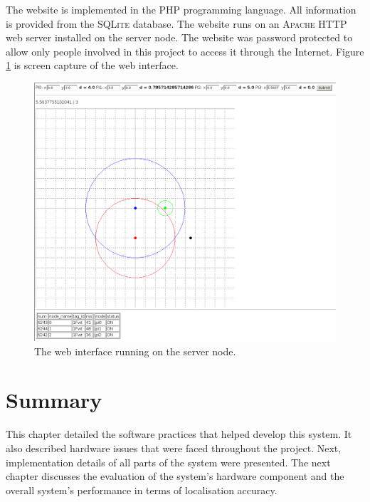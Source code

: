 The website is implemented in the \textsc{PHP} programming language. All information is provided from the \textsc{SQLite} database. The website runs on an \textsc{Apache} HTTP web server installed on the server node. The website was password protected to allow only people involved in this project to access it through the Internet. Figure \ref{fig:web} is screen capture of the web interface.

\begin{figure}[h]
	\begin{center}
		\includegraphics[width=.8\textwidth]{figures/sim}
		\caption{The web interface running on the server node.}
		\label{fig:web}
	\end{center}
\end{figure}


\section{Summary}

This chapter detailed the software practices that helped develop this system. It also described hardware issues that were faced throughout the project. Next, implementation details of all parts of the system were presented. The next chapter discusses the evaluation of the system's hardware component and the overall system's performance in terms of localisation accuracy.
